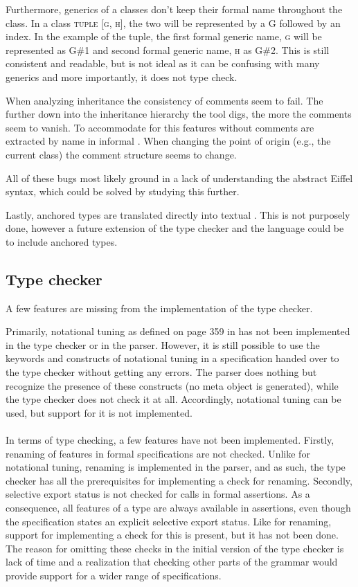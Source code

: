 Furthermore, generics of a classes don't keep their formal name throughout the class. In a class \textsc{tuple [g, h]}, the two will be represented by a G followed by an index. In the example of the tuple, the first formal generic name, \textsc{g} will be represented as G\#1 and second formal generic name, \textsc{h} as G\#2. This is still consistent and readable, but is not ideal as it can be confusing with many generics and more importantly, it does not type check.

When analyzing inheritance the consistency of comments seem to fail. The further down into the inheritance hierarchy the tool digs, the more the comments seem to vanish. To accommodate for this features without comments are extracted by name in informal \bon. When changing the point of origin (e.g., the current class) the comment structure seems to change.

All of these bugs most likely ground in a lack of understanding the abstract Eiffel syntax, which could be solved by studying this further.

Lastly, anchored types are translated directly into textual \bon. This is not purposely done, however a future extension of the type checker and the \bon{} language could be to include anchored types.

\subsection{Type checker}
A few features are missing from the implementation of the type checker.

Primarily, notational tuning as defined on page 359 in \cite{walden1995} has not been implemented in the type checker or in the parser. However, it is still possible to use the keywords and constructs of notational tuning in a specification handed over to the type checker without getting any errors. The parser does nothing but recognize the presence of these constructs (no meta object is generated), while the type checker does not check it at all. Accordingly, notational tuning can be used, but support for it is not implemented.
\paragraph{}
In terms of type checking, a few features have not been implemented. Firstly, renaming of features in formal specifications are not checked. Unlike for notational tuning, renaming is implemented in the parser, and as such, the type checker has all the prerequisites for implementing a check for renaming. Secondly, selective export status is not checked for calls in formal assertions. As a consequence, all features of a type are always available in assertions, even though the specification states an explicit selective export status. Like for renaming, support for implementing a check for this is present, but it has not been done. The reason for omitting these checks in the initial version of the type checker is lack of time and a realization that checking other parts of the grammar would provide support for a wider range of specifications.
